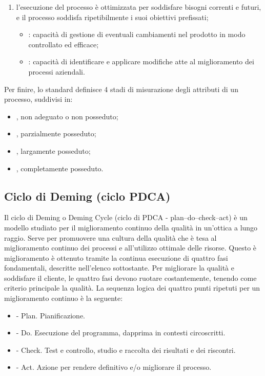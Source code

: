 \begin{enumerate}
\begin{itemize}
\end{itemize}
\item  {} l'esecuzione del processo è ottimizzata per soddisfare bisogni correnti e futuri, e il processo soddisfa ripetibilmente i suoi obiettivi prefissati;
\begin{itemize}
\item {}: capacità di gestione di eventuali cambiamenti nel prodotto in modo controllato ed efficace;
\item {}: capacità di identificare e applicare modifiche atte al miglioramento dei processi aziendali.
\end{itemize}
\end{enumerate}
Per finire, lo standard definisce 4 stadi di misurazione degli attributi di un processo, suddivisi in:
\begin{itemize}
\item {}, non adeguato o non posseduto;
\item {}, parzialmente posseduto;
\item {}, largamente posseduto;
\item {}, completamente posseduto.
\end{itemize}

\subsection{Ciclo di Deming (ciclo PDCA)} %

Il ciclo di Deming o Deming Cycle (ciclo di PDCA - plan–do–check–act) è un modello studiato per il miglioramento continuo della qualità in un'ottica a lungo raggio. Serve per promuovere una cultura della qualità che è tesa al miglioramento continuo dei processi e all'utilizzo ottimale delle risorse. Questo è miglioramento è ottenuto tramite la continua esecuzione di quattro fasi fondamentali, descritte nell'elenco sottostante. Per migliorare la qualità e soddisfare il cliente, le quattro fasi devono ruotare costantemente, tenendo come criterio principale la qualità.
La sequenza logica dei quattro punti ripetuti per un miglioramento continuo è la seguente:
\begin{itemize}
\item {} - Plan. Pianificazione.
\item {} - Do. Esecuzione del programma, dapprima in contesti circoscritti.
\item {} - Check. Test e controllo, studio e raccolta dei risultati e dei riscontri.
\item {} - Act. Azione per rendere definitivo e/o migliorare il processo.
\end{itemize}

